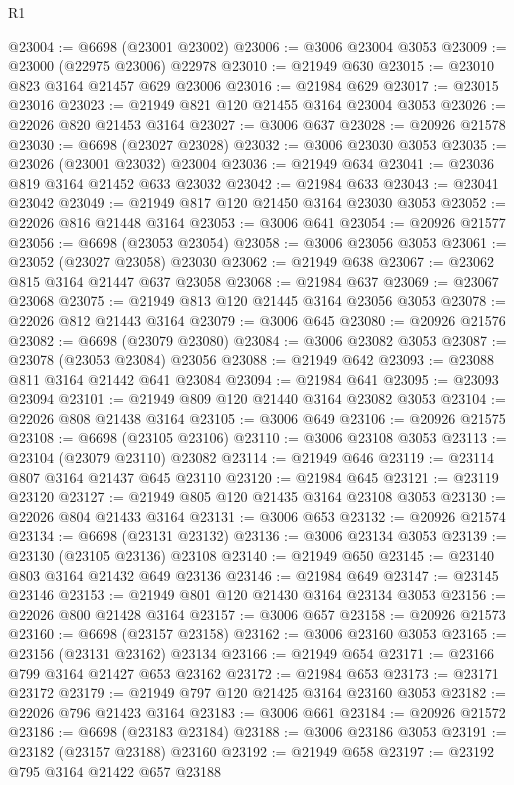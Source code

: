 \begin{lexlean}{R1}
\begin{coremodule}
@23004 := @6698 (@23001 @23002)
@23006 := @3006 @23004 @3053
@23009 := @23000 (@22975 @23006) @22978
@23010 := @21949 @630
@23015 := @23010 @823 @3164 @21457 @629 @23006
@23016 := @21984 @629
@23017 := @23015 @23016
@23023 := @21949 @821 @120 @21455 @3164 @23004 @3053
@23026 := @22026 @820 @21453 @3164
@23027 := @3006 @637
@23028 := @20926 @21578
@23030 := @6698 (@23027 @23028)
@23032 := @3006 @23030 @3053
@23035 := @23026 (@23001 @23032) @23004
@23036 := @21949 @634
@23041 := @23036 @819 @3164 @21452 @633 @23032
@23042 := @21984 @633
@23043 := @23041 @23042
@23049 := @21949 @817 @120 @21450 @3164 @23030 @3053
@23052 := @22026 @816 @21448 @3164
@23053 := @3006 @641
@23054 := @20926 @21577
@23056 := @6698 (@23053 @23054)
@23058 := @3006 @23056 @3053
@23061 := @23052 (@23027 @23058) @23030
@23062 := @21949 @638
@23067 := @23062 @815 @3164 @21447 @637 @23058
@23068 := @21984 @637
@23069 := @23067 @23068
@23075 := @21949 @813 @120 @21445 @3164 @23056 @3053
@23078 := @22026 @812 @21443 @3164
@23079 := @3006 @645
@23080 := @20926 @21576
@23082 := @6698 (@23079 @23080)
@23084 := @3006 @23082 @3053
@23087 := @23078 (@23053 @23084) @23056
@23088 := @21949 @642
@23093 := @23088 @811 @3164 @21442 @641 @23084
@23094 := @21984 @641
@23095 := @23093 @23094
@23101 := @21949 @809 @120 @21440 @3164 @23082 @3053
@23104 := @22026 @808 @21438 @3164
@23105 := @3006 @649
@23106 := @20926 @21575
@23108 := @6698 (@23105 @23106)
@23110 := @3006 @23108 @3053
@23113 := @23104 (@23079 @23110) @23082
@23114 := @21949 @646
@23119 := @23114 @807 @3164 @21437 @645 @23110
@23120 := @21984 @645
@23121 := @23119 @23120
@23127 := @21949 @805 @120 @21435 @3164 @23108 @3053
@23130 := @22026 @804 @21433 @3164
@23131 := @3006 @653
@23132 := @20926 @21574
@23134 := @6698 (@23131 @23132)
@23136 := @3006 @23134 @3053
@23139 := @23130 (@23105 @23136) @23108
@23140 := @21949 @650
@23145 := @23140 @803 @3164 @21432 @649 @23136
@23146 := @21984 @649
@23147 := @23145 @23146
@23153 := @21949 @801 @120 @21430 @3164 @23134 @3053
@23156 := @22026 @800 @21428 @3164
@23157 := @3006 @657
@23158 := @20926 @21573
@23160 := @6698 (@23157 @23158)
@23162 := @3006 @23160 @3053
@23165 := @23156 (@23131 @23162) @23134
@23166 := @21949 @654
@23171 := @23166 @799 @3164 @21427 @653 @23162
@23172 := @21984 @653
@23173 := @23171 @23172
@23179 := @21949 @797 @120 @21425 @3164 @23160 @3053
@23182 := @22026 @796 @21423 @3164
@23183 := @3006 @661
@23184 := @20926 @21572
@23186 := @6698 (@23183 @23184)
@23188 := @3006 @23186 @3053
@23191 := @23182 (@23157 @23188) @23160
@23192 := @21949 @658
@23197 := @23192 @795 @3164 @21422 @657 @23188

\end{coremodule}
\end{lexlean}

